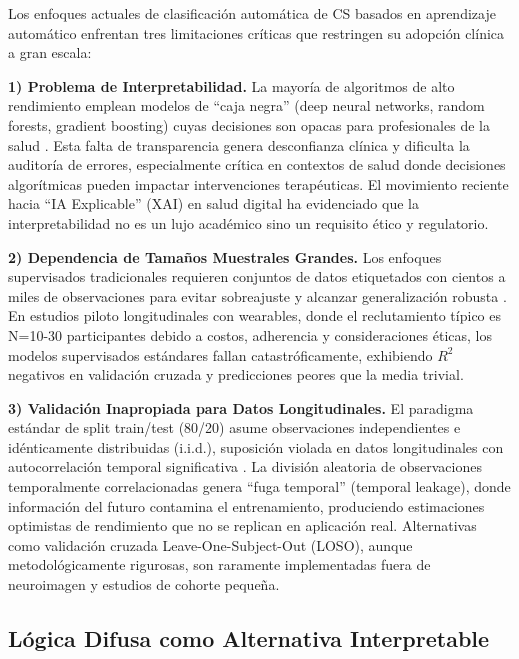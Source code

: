 \documentclass[journal,twoside,web]{ieeecolor}
\begin{document}
Los enfoques actuales de clasificación automática de CS basados en aprendizaje automático enfrentan tres limitaciones críticas que restringen su adopción clínica a gran escala:

\textbf{1) Problema de Interpretabilidad.} La mayoría de algoritmos de alto rendimiento emplean modelos de ``caja negra'' (deep neural networks, random forests, gradient boosting) cuyas decisiones son opacas para profesionales de la salud \cite{Rajkomar2019,Molnar2020}. Esta falta de transparencia genera desconfianza clínica y dificulta la auditoría de errores, especialmente crítica en contextos de salud donde decisiones algorítmicas pueden impactar intervenciones terapéuticas. El movimiento reciente hacia ``IA Explicable'' (XAI) en salud digital \cite{Escalante2023} ha evidenciado que la interpretabilidad no es un lujo académico sino un requisito ético y regulatorio.

\textbf{2) Dependencia de Tamaños Muestrales Grandes.} Los enfoques supervisados tradicionales requieren conjuntos de datos etiquetados con cientos a miles de observaciones para evitar sobreajuste y alcanzar generalización robusta \cite{Hastie2020}. En estudios piloto longitudinales con wearables, donde el reclutamiento típico es N=10-30 participantes debido a costos, adherencia y consideraciones éticas, los modelos supervisados estándares fallan catastróficamente, exhibiendo $R^2$ negativos en validación cruzada y predicciones peores que la media trivial.

\textbf{3) Validación Inapropiada para Datos Longitudinales.} El paradigma estándar de split train/test (80/20) asume observaciones independientes e idénticamente distribuidas (i.i.d.), suposición violada en datos longitudinales con autocorrelación temporal significativa \cite{Varoquaux2017,Poldrack2020}. La división aleatoria de observaciones temporalmente correlacionadas genera ``fuga temporal'' (temporal leakage), donde información del futuro contamina el entrenamiento, produciendo estimaciones optimistas de rendimiento que no se replican en aplicación real. Alternativas como validación cruzada Leave-One-Subject-Out (LOSO), aunque metodológicamente rigurosas, son raramente implementadas fuera de neuroimagen y estudios de cohorte pequeña.

\subsection{Lógica Difusa como Alternativa Interpretable}
\end{document}
